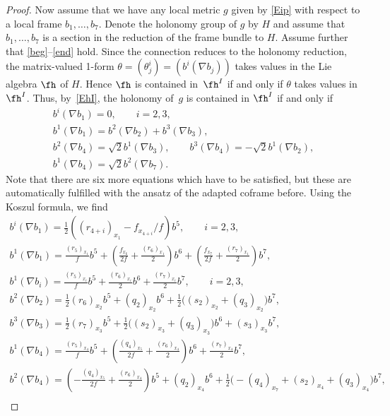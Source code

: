 \begin{proof}
Now assume that we have any local metric $g$ given by \eqref{Eip} with respect to a local frame $b_1,\dots,b_7$. Denote the holonomy group of $g$ by $H$ and assume that $b_1,\dots,b_7$ is a section in the reduction of the frame bundle to $H$. Assume further that \eqref{beg}--\eqref{end} hold. Since the connection reduces to the holonomy reduction, the matrix-valued 1-form $\theta=(\theta^i_j)=(b^i(\nabla b_j))$ takes values in the Lie algebra $\fh$ of $H$. Hence $\fh $ is contained in~$\fh^I$ if and only if $\theta$ takes values in $\fh^I$. Thus, by~\eqref{EhI}, the holonomy of~$g$ is contained in $\fh^I$ if and only if
\begin{gather}
 b^i(\nabla b_{1})=0,\qquad i=2,3, \label{Es1}\\
 b^1(\nabla b_1)=b^2(\nabla b_2)+b^3(\nabla b_3), \label{Es2}\\
 b^2(\nabla b_4)=\sqrt 2 b^1(\nabla b_3),\qquad b^3(\nabla b_4)=-\sqrt 2 b^1(\nabla b_2), \label{Es3}\\
 b^1(\nabla b_4)=\sqrt 2b^2(\nabla b_7). \label{Es4}
\end{gather}
Note that there are six more equations which have to be satisfied, but these are automatically fulfilled with the ansatz of the adapted coframe before. Using the Koszul formula, we find
\begin{gather*}
b^i(\nabla b_{1}) = \tfrac12 ((r_{4+i})_{x_1}- f_{x_{4+i}}/{f}) b^5 ,\qquad i=2,3,\label{En1}\\
b^1(\nabla b_1) = \tfrac{(r_5)_{x_1}}{f} b^5 +\left(\tfrac{f_{x_6}}{2f}+\tfrac{(r_6)_{x_1}}{2}\right) b^6+\left(\tfrac{f_{x_7}}{2f}+\tfrac{(r_7)_{x_1}}{2}\right) b^7, \label{En2}\\
b^{1}(\nabla b_{i}) = \tfrac{(r_5)_{x_i}}f b^5 + \tfrac{ (r_6)_{x_i}}2 b^6 + \tfrac{(r_7)_{x_i}}2 b^7,\qquad i=2,3,\label{En2a}\\
b^{2}(\nabla b_{2}) = \tfrac12 (r_6)_{x_2} b^5+(q_2)_{x_2} b^6+\tfrac12\big((s_2)_{x_2}+(q_3)_{x_2}\big) b^7, \label{En3}\\
b^3(\nabla b_3) = \tfrac12 (r_7)_{x_3} b^5+\tfrac12\big((s_2)_{x_3}+(q_3)_{x_3}\big) b^6+(s_3)_{x_3} b^7 , \label{En4}\\
b^1(\nabla b_4) = \tfrac{(r_5)_{x_4}}{f} b^5 +\left(\tfrac{(q_4)_{x_5}}{2f}+\tfrac{(r_6)_{x_4}}{2}\right) b^6+ \tfrac{(r_7)_{x_4}}{2} b^7 , \label{En5} \\
b^2(\nabla b_4) = \left(-\tfrac{(q_4)_{x_5}}{2f}+\tfrac{(r_6)_{x_4}}{2}\right)b^5+ (q_2)_{x_4} b^6 + \tfrac12 \big({-}(q_4)_{x_7}+(s_2)_{x_4}+(q_3)_{x_4}\big) b^7 ,\label{En6}\\

\end{gather*}
\end{proof}
